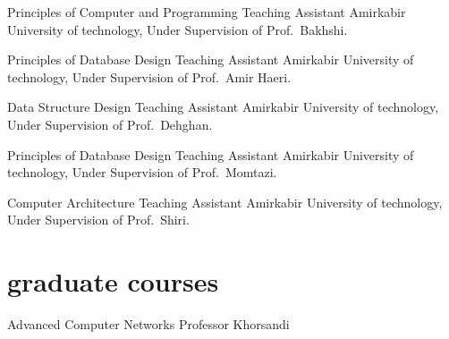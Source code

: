 \documentclass[]{friggeri-cv} %
\begin{document}
\begin{entrylist}
	{Principles of Computer and Programming}
	{Teaching Assistant}
	{Amirkabir University of technology, Under Supervision of Prof.\ Bakhshi.}


	{Principles of Database Design}
	{Teaching Assistant}
	{Amirkabir University of technology, Under Supervision of Prof.\ Amir Haeri.}

	
	{Data Structure Design}
	{Teaching Assistant}
	{Amirkabir University of technology, Under Supervision of Prof.\ Dehghan.}

	
	{Principles of Database Design}
	{Teaching Assistant}
	{Amirkabir University of technology, Under Supervision of Prof.\ Momtazi.}


	{Computer Architecture}
	{Teaching Assistant}
	{Amirkabir University of technology, Under Supervision of Prof.\ Shiri.}


\end{entrylist}


\section{graduate courses}

\begin{entrylist}

	{Advanced Computer Networks}
	{Professor Khorsandi}
	{}


\end{entrylist}
\pagebreak

\end{document}
